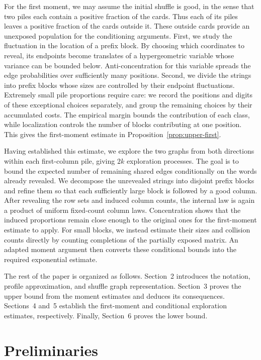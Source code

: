 \documentclass[11pt]{article}
\numberwithin{equation}{section}
\theoremstyle{definition}
\theoremstyle{remark}
\newcommand{\1}{\mathbf 1}
\begin{document}
For the first moment, we may assume the initial shuffle is good, in
the sense that two piles each contain a positive fraction of the cards.
Thus each of its piles leaves a positive fraction of the cards outside
it. These outside cards provide an unexposed population for the
conditioning arguments. First, we study the fluctuation in the location
of a prefix block. By choosing which coordinates to reveal, its
endpoints become translates of a hypergeometric variable whose variance
can be bounded below. Anti-concentration for this variable spreads the
edge probabilities over sufficiently many positions. Second, we divide
the strings into prefix blocks whose sizes are controlled by their
endpoint fluctuations. Extremely small pile proportions require
care: we record the positions and digits of these exceptional choices
separately, and group the remaining choices by their accumulated costs.
The empirical margin bounds the contribution of each class, while
localization controls the number of blocks contributing at one position.
This gives the first-moment estimate in
Proposition~\ref{prop:upper-first}.

Having established this estimate, we explore the two graphs from both
directions within each first-column pile, giving $2k$ exploration
processes. The goal is to bound the expected number of remaining shared
edges conditionally on the words already revealed. We decompose the
unrevealed strings into disjoint prefix blocks and refine them so that
each sufficiently large block is followed by a good column. After
revealing the row sets and induced column counts, the internal law is
again a product of uniform fixed-count column laws. Concentration shows
that the induced proportions remain close enough to the original ones
for the first-moment estimate to apply. For small blocks, we instead
estimate their sizes and collision counts directly by counting
completions of the partially exposed matrix. An adapted moment argument
then converts these conditional bounds into the required exponential
estimate.

The rest of the paper is organized as follows. Section~2 introduces
the notation, profile approximation, and shuffle graph representation.
Section~3 proves the upper bound from the moment estimates and deduces
its consequences. Sections~4 and~5 establish the first-moment and
conditional exploration estimates, respectively. Finally, Section~6
proves the lower bound.


\section{Preliminaries}
\label{sec:preliminaries}
\end{document}
